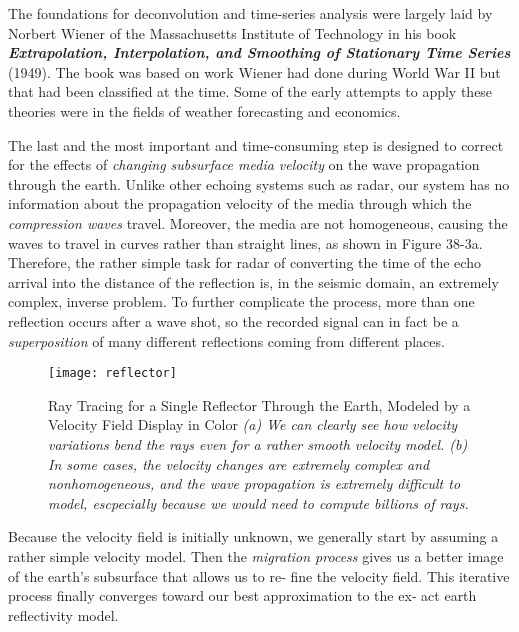 \documentclass[twocolumn]{article}
\begin{document}
The foundations for deconvolution and time-series analysis were largely laid by Norbert Wiener of the Massachusetts Institute of Technology in his book \textbf{\textit{Extrapolation, Interpolation, and Smoothing of Stationary Time Series}} (1949).
The book was based on work Wiener had done during World War II but that had been classified at the time. 
Some of the early attempts to apply these theories were in the fields of weather forecasting and economics.



The last and the most important and time-consuming step is designed to correct for the effects of \textit{changing subsurface media velocity }on the wave propagation through the earth. Unlike other echoing systems such as radar, our system has no information about the propagation velocity of the media through which the \emph{compression waves} travel. Moreover, the media are not homogeneous, causing the waves to travel in curves rather than straight lines, as shown in Figure 38-3a. Therefore, the rather simple task for radar of converting the time of the echo arrival into the distance of the reflection is, in the seismic domain, an extremely complex, inverse problem. To further complicate the process, more than one reflection occurs after a wave shot, so the recorded signal can in fact be a \emph{superposition} of many different reflections coming from different places.

\begin{figure}[htb]
        \centering
        \texttt{[image: reflector]}
        \caption{Ray Tracing for a Single Reflector Through the Earth, Modeled by a Velocity Field Display in Color \small{\emph{(a) We can clearly see how velocity variations bend the rays even for a rather smooth velocity model. (b) In some cases, the velocity changes are extremely complex and nonhomogeneous, and the wave propagation is extremely difficult to model, escpecially because we would need to compute billions of rays.}}}
        \label{reflector}
\end{figure}

Because the velocity field is initially unknown, we generally start by assuming a rather simple velocity model. Then the \textit{migration process} gives us a better image of the earth's subsurface that allows us to re‐ fine the velocity field. This iterative process finally converges toward our best approximation to the ex‐ act earth reflectivity model.
\end{document}
